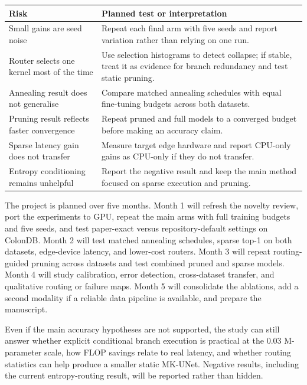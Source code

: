 \documentclass[10pt,a4paper]{article}
\begin{document}
\begin{center}\small
\renewcommand{\arraystretch}{1.08}
\begin{tabularx}{\linewidth}{@{}p{4.15cm}X@{}}
\toprule
Risk & Planned test or interpretation \\
\midrule
Small gains are seed noise & Repeat each final arm with five seeds and report variation rather than relying on one run. \\
Router selects one kernel most of the time & Use selection histograms to detect collapse; if stable, treat it as evidence for branch redundancy and test static pruning. \\
Annealing result does not generalise & Compare matched annealing schedules with equal fine-tuning budgets across both datasets. \\
Pruning result reflects faster convergence & Repeat pruned and full models to a converged budget before making an accuracy claim. \\
Sparse latency gain does not transfer & Measure target edge hardware and report CPU-only gains as CPU-only if they do not transfer. \\
Entropy conditioning remains unhelpful & Report the negative result and keep the main method focused on sparse execution and pruning. \\
\bottomrule
\end{tabularx}
\end{center}

The project is planned over five months. Month 1 will refresh the novelty review, port the experiments to GPU, repeat the main arms with full training budgets and five seeds, and test paper-exact versus repository-default settings on ColonDB. Month 2 will test matched annealing schedules, sparse top-1 on both datasets, edge-device latency, and lower-cost routers. Month 3 will repeat routing-guided pruning across datasets and test combined pruned and sparse models. Month 4 will study calibration, error detection, cross-dataset transfer, and qualitative routing or failure maps. Month 5 will consolidate the ablations, add a second modality if a reliable data pipeline is available, and prepare the manuscript.

Even if the main accuracy hypotheses are not supported, the study can still answer whether explicit conditional branch execution is practical at the 0.03 M-parameter scale, how FLOP savings relate to real latency, and whether routing statistics can help produce a smaller static MK-UNet. Negative results, including the current entropy-routing result, will be reported rather than hidden.


{\footnotesize
\renewcommand{\em}{}


}
\end{document}
